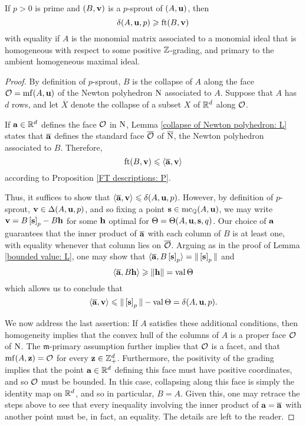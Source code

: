 \documentclass[11pt]{amsart}
\renewcommand{\!}[1]{{\color{red}\text{$\star$\,}#1\,$\star$}}
\newcommand{\ol}[1]{\overline{#1}}
\begin{document}
\begin{lemma}  If  $p>0$ is prime and $(B, \mathbf{v})$ is a $p$-sprout of  $(A, \mathbf{u})$, then \[ \delta(A, \mathbf{u}, p) \geqslant \operatorname{ft}(B, \mathbf{v})\]
with equality if $A$ is the monomial matrix associated to a monomial ideal that is homogeneous with respect to some positive $\mathbb{Z}$-grading, and primary to the ambient homogeneous maximal ideal.
\end{lemma}

\begin{proof}
By definition of $p$-sprout,  $B$ is the collapse of $A$ along the face $\mathcal{O} = \operatorname{mf}(A, \mathbf{u})$ of the Newton polyhedron $\mathrm{N}$ associated to $A$.  Suppose that $A$ has $d$ rows, and let $\ol{X}$ denote the collapse of a subset $X$ of $\mathbb{R}^d$ along $\mathcal{O}$.  

If $\mathbf{a} \in \mathbb{R}^d$ defines the face $\mathcal{O}$ in $\mathrm{N}$, Lemma \ref{collapse of Newton polyhedron: L}  states that $\ol{\vv{a}}$ defines the standard face $\ol{\O}$ of $\ol{\N}$, the Newton polyhedron associated to $B$.  Therefore,
\[ \ft{B}{\vv{v}} \leq \iprod{\ol{\vv{a}}}{\vv{v}} \] according to Proposition \ref{FT descriptions: P}.

Thus, it suffices to show that $\iprod{\ol{\vv{a}}}{\vv{v}} \leq \delta(A, \vv{u}, p)$.  However, by definition of $p$-sprout, $\mathbf{v} \in \Delta(A, \mathbf{u}, p)$, and so fixing a point $\mathbf{s} \in \operatorname{mc}_{\mathbb{Q}}(A, \mathbf{u})$, we may write $ \mathbf{v} = B \left[ \mathbf{s} \right]_p - B \mathbf{h}$ for some $\mathbf{h}$  optimal for $\Theta = \Theta(A, \mathbf{u}, \mathbf{s}, q)$.  Our choice of $\mathbf{a}$ guarantees that the inner product of $\ol{\vv{a}}$ with each column of $B$ is at least one, with equality whenever that column lies on $\ol{\O}$.  Arguing as in the proof of Lemma \ref{bounded value: L}, one may show that $\iprod{\ol{\vv{a}}}{B \tail{\vv{s}}_p} = \norm{\tail{\vv{s}}_p}$ and \[ \iprod{\ol{\vv{a}}}{ B \vv{h}} \geq \norm{\vv{h}} = \val \ip \] 
which allows us to conclude that \[ \iprod{\ol{\vv{a}}}{\vv{v}} \leq \norm{\tail{\vv{s}}_p} - \val \ip= \delta(A, \vv{u}, p).\]

We now address the last assertion:  If $A$ satisfies these additional conditions, then homogeneity implies that the convex hull of the columns of $A$ is a proper face $\mathcal{O}$ of $\mathrm{N}$.  The $\mathfrak{m}$-primary assumption further implies that $\mathcal{O}$ is a facet, and that $\operatorname{mf}(A, \mathbf{z}) = \mathcal{O}$ for every $\mathbf{z} \in \mathbb{Z}_+^d$.  Furthermore, the positivity of the grading implies that the point $\mathbf{a} \in \mathbb{R}^d$ defining this face must have positive coordinates, and so $\mathcal{O}$ must be bounded.  In this case, collapsing along this face is simply the identity map on $\mathbb{R}^d$, and so in particular, $B=A$.  Given this, one may retrace the steps above to see that every inequality involving the inner product of $\vv{a} = \ol{\vv{a}}$ with another point must be, in fact, an equality.  The details are left to the reader.
\end{proof}
\end{document}
